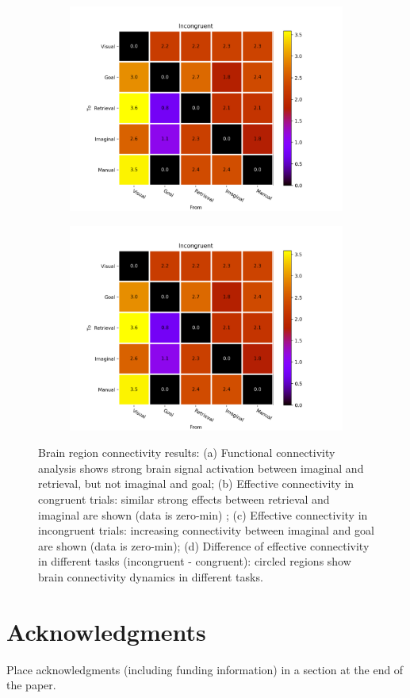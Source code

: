 \documentclass[10pt,letterpaper]{article}
\begin{document}
\begin{figure}[ht]
\begin{subfigure}{.5\textwidth}
  \includegraphics[width=\linewidth]{Incongruent_effect_conn.png}
  \caption{}
\end{subfigure}%
\begin{subfigure}{.5\textwidth}
  \centering
  \includegraphics[width=\linewidth]{Incongruent_effect_conn.png}
  \caption{}
\end{subfigure}
\caption{Brain region connectivity results: (a) Functional connectivity analysis shows strong brain signal activation between imaginal and retrieval, but not imaginal and goal; (b) Effective connectivity in congruent trials: similar strong effects between retrieval and imaginal are shown (data is zero-min) ; (c) Effective connectivity in incongruent trials: increasing connectivity between imaginal and goal are shown (data is zero-min); (d) Difference of effective connectivity in different tasks (incongruent - congruent): circled regions show brain connectivity dynamics in different tasks.}
\label{fig:conn}
\end{figure}


\section{Acknowledgments}

Place acknowledgments (including funding information) in a section at
the end of the paper.



\setlength{\bibleftmargin}{.125in}
\setlength{\bibindent}{-\bibleftmargin}

\end{document}
